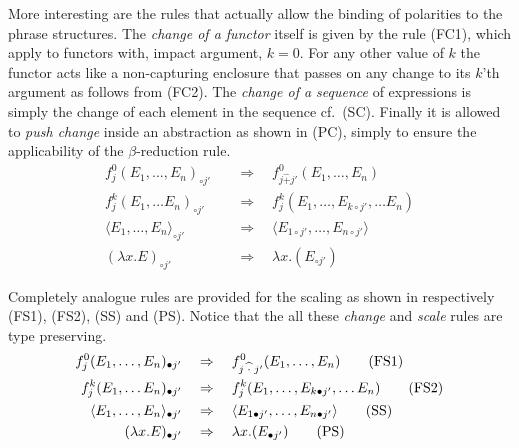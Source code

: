 \begin{definition}
More interesting are the rules that actually allow the binding of polarities to the phrase structures. The \emph{change of a functor} itself is given by the rule (FC1), which apply to functors with, impact argument, $k = 0$. For any other value of $k$ the functor acts like a non-capturing enclosure that passes on any change to its $k$'th argument as follows from (FC2). The \emph{change of a sequence} of expressions is simply the change of each element in the sequence cf.\ (SC). Finally it is allowed to \emph{push change} inside an abstraction as shown in (PC), simply to ensure the applicability of the $\beta$-reduction rule.
\begin{align}
f_j^0(E_1, \ldots, E_n)_{\circ j'} &\quad \Rightarrow \quad f_{j \widehat{+} j'}^0(E_1, \ldots, E_n)  \tag{FC1} \\
f_j^k(E_1, \ldots E_n)_{\circ j'} &\quad \Rightarrow \quad f_{j}^k(E_1, \ldots, E_{k \circ j'}, \ldots E_n )  \tag{FC2} \\
 \langle E_1, \ldots, E_n \rangle_{\circ j'} &\quad \Rightarrow \quad  \langle E_{1 \circ j'}, \ldots,  E_{n \circ j'} \rangle  \tag{SC} \\
 (\lambda x . E)_{\circ j'} &\quad \Rightarrow \quad 
 \lambda x . (E_{\circ j'})
 \tag{PC} 
\end{align}

Completely analogue rules are provided for the scaling as shown in respectively (FS1), (FS2), (SS) and (PS). Notice that the all these \emph{change} and \emph{scale} rules are type preserving.
\begin{align}
f_j^0(E_1, \ldots, E_n)_{\bullet j'} &\quad \Rightarrow \quad f_{j \widehat{\hspace{2.5pt} \cdot \hspace{2.5pt}} j'}^0(E_1, \ldots, E_n)  \tag{FS1} \\
f_j^k(E_1, \ldots E_n)_{\bullet j'} &\quad \Rightarrow \quad f_{j}^k(E_1, \ldots, E_{k \bullet j'}, \ldots E_n )  \tag{FS2} \\
 \langle E_1, \ldots, E_n \rangle_{\bullet j'} &\quad \Rightarrow \quad  \langle E_{1 \bullet j'}, \ldots,  E_{n \bullet j'} \rangle  \tag{SS} \\
(\lambda x . E)_{\bullet j'} &\quad \Rightarrow \quad 
 \lambda x . (E_{\bullet j'})
 \tag{PS} 
\end{align}


\end{definition}
